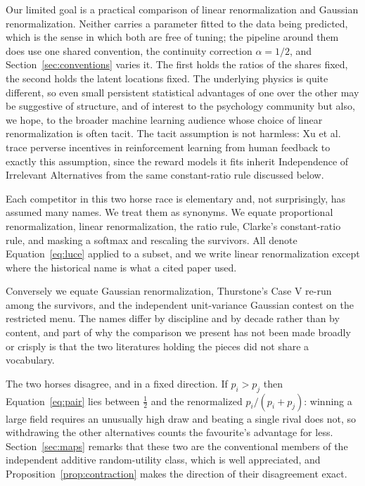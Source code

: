 \documentclass[11pt]{article}
\begin{document}
Our limited goal is a practical comparison of linear renormalization and Gaussian
renormalization. Neither carries a parameter fitted to the data being predicted, which is the
sense in which both are free of tuning; the pipeline around them does use one shared convention,
the continuity correction $\alpha = 1/2$, and Section~\ref{sec:conventions} varies it.
The first holds the ratios of the shares fixed, the second holds the latent
locations fixed. The underlying physics is quite different, so even small persistent statistical
advantages of one over the other may be suggestive of structure, and of interest to the
psychology community but also, we hope, to the broader machine learning audience whose choice of
linear renormalization is often tacit. The tacit assumption is not harmless: Xu et al.\
\cite{xu2023rlhf} trace perverse incentives in reinforcement learning from human feedback to
exactly this assumption, since the reward models it fits inherit Independence of Irrelevant
Alternatives from the same constant-ratio rule discussed below.

Each competitor in this two horse race is elementary and, not surprisingly, has assumed many
names. We treat them as synonyms. We equate proportional renormalization, linear renormalization,
the ratio rule, Clarke's constant-ratio rule, and masking a softmax and rescaling the survivors.
All denote Equation~\eqref{eq:luce} applied to a subset, and we write linear renormalization
except where the historical name is what a cited paper used.

Conversely we equate Gaussian renormalization, Thurstone's Case V re-run among the survivors, and
the independent unit-variance Gaussian contest on the restricted menu. The names differ by
discipline and by decade rather than by content, and part of why the comparison we present has
not been made broadly or crisply is that the two literatures holding the pieces did not share a
vocabulary.

The two horses disagree, and in a fixed direction. If $p_i > p_j$ then Equation~\eqref{eq:pair}
lies between $\tfrac12$ and the renormalized $p_i/(p_i+p_j)$: winning a large field requires an
unusually high draw and beating a single rival does not, so withdrawing the other alternatives
counts the favourite's advantage for less. Section~\ref{sec:maps} remarks that these two are the
conventional members of the independent additive random-utility class, which is well appreciated,
and Proposition~\ref{prop:contraction} makes the direction of their disagreement exact.
\end{document}
